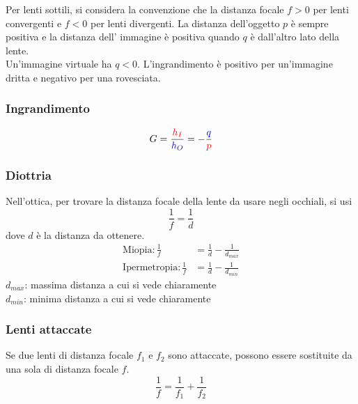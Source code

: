 \begin{center}
\end{center}
Per lenti sottili, si considera la convenzione che la distanza focale $f > 0$ per lenti convergenti
e $f<0$ per lenti divergenti. La distanza dell'oggetto $p$ è sempre positiva e la distanza dell'
immagine è positiva quando $q$ è dall'altro lato della lente.\\
Un'immagine virtuale ha $q < 0$. L'ingrandimento è positivo per un'immagine dritta e negativo per una
rovesciata.

\subsubsection{Ingrandimento}
\begin{equation*}
  G = \frac{\mathcolor{red}{h_I}}{\mathcolor{blue}{h_O}} =
  -\frac{\mathcolor{blue}{q}}{\mathcolor{red}{p}}
\end{equation*}

\subsubsection{Diottria}
Nell'ottica, per trovare la distanza focale della lente da usare negli occhiali, si usi
\begin{equation*}
  \frac{1}{f} =  \frac{1}{d} 
\end{equation*}
dove $d$ è la distanza da ottenere.
\begin{align*}
  \text{Miopia:}\,\frac{1}{f}&=\frac{1}{d}-\frac{1}{d_{max}}\\
  \text{Ipermetropia:}\,\frac{1}{f}&=\frac{1}{d}-\frac{1}{d_{min}} 
\end{align*}
$d_{max}$: massima distanza a cui si vede chiaramente\\
$d_{min}$: minima distanza a cui si vede chiaramente

\subsubsection{Lenti attaccate}
Se due lenti di distanza focale $f_1$ e $f_2$ sono attaccate, possono essere sostituite da una sola
di distanza focale $f$.
\begin{equation*}
  \frac{1}{f} = \frac{1}{f_1}+\frac{1}{f_2}
\end{equation*}

